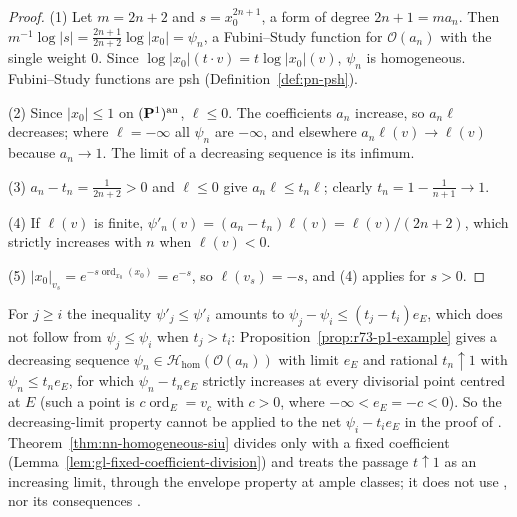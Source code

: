 \begin{proof}
(1) Let $m=2n+2$ and $s=x_0^{2n+1}$, a form of degree $2n+1=ma_n$. Then $m^{-1}\log|s|=\frac{2n+1}{2n+2}\log|x_0|=\psi_n$, a Fubini--Study function for
$\mathcal O(a_n)$ with the single weight $0$. Since $\log|x_0|(t\cdot v)=t\log|x_0|(v)$, $\psi_n$ is homogeneous. Fubini--Study functions are psh
(Definition~\ref{def:pn-psh}).

(2) Since $|x_0|\le1$ on $(\mathbf{P}^1)^{\mathrm{an}}$, $\ell\le0$. The coefficients $a_n$ increase, so $a_n\ell$ decreases; where $\ell=-\infty$ all $\psi_n$ are $-\infty$, and
elsewhere $a_n\ell(v)\to\ell(v)$ because $a_n\to1$. The limit of a decreasing sequence is its infimum.

(3) $a_n-t_n=\frac1{2n+2}>0$ and $\ell\le0$ give $a_n\ell\le t_n\ell$; clearly $t_n=1-\frac1{n+1}\to1$.

(4) If $\ell(v)$ is finite, $\psi'_n(v)=(a_n-t_n)\ell(v)=\ell(v)/(2n+2)$, which strictly increases with $n$ when $\ell(v)<0$.

(5) $|x_0|_{v_s}=e^{-s\operatorname{ord}_{x_0}(x_0)}=e^{-s}$, so $\ell(v_s)=-s$, and (4) applies for $s>0$.
\end{proof}

\begin{remark}\label{rmk:r73-bj-6-21}
\notready
{}
For $j\ge i$ the inequality $\psi'_j\le\psi'_i$ amounts to $\psi_j-\psi_i\le(t_j-t_i)e_E$, which does not follow from $\psi_j\le\psi_i$ when $t_j>t_i$:
Proposition~\ref{prop:r73-p1-example} gives a decreasing sequence $\psi_n\in\mathcal H_{\mathrm{hom}}(\mathcal O(a_n))$ with limit $e_E$ and rational $t_n\uparrow1$ with
$\psi_n\le t_ne_E$, for which $\psi_n-t_ne_E$ strictly increases at every divisorial point centred at $E$ (such a point is $c\operatorname{ord}_E=v_c$ with
$c>0$, where $-\infty<e_E=-c<0$). So the decreasing-limit property cannot be applied to
the net $\psi_i-t_ie_E$ in the proof of \cite[Theorem~6.21]{BJ22}. Theorem~\ref{thm:nn-homogeneous-siu} divides only with a fixed coefficient
(Lemma~\ref{lem:gl-fixed-coefficient-division}) and treats the passage $t\uparrow1$ as an increasing limit, through the envelope property at ample classes; it does
not use \cite[Theorem~6.21]{BJ22}, nor its consequences \cite[Corollaries~6.22, 6.41 and Theorems~6.31, 6.35, 6.40]{BJ22}.
\end{remark}
